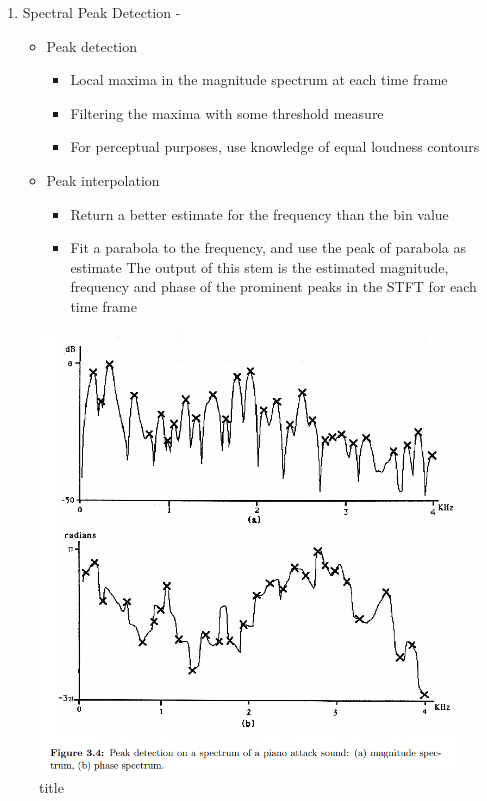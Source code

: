 \documentclass[11pt]{article}
\makeatletter
\def\maxwidth{\ifdim\Gin@nat@width>\linewidth\linewidth
    \else\Gin@nat@width\fi}
\let\Oldincludegraphics\includegraphics
\renewcommand{\includegraphics}[1]{\Oldincludegraphics[width=.8\maxwidth]{#1}}
\providecommand{\tightlist}{%
      \setlength{\itemsep}{0pt}\setlength{\parskip}{0pt}}
\makeatother
\begin{document}
    \begin{enumerate}
\def\labelenumi{\arabic{enumi}.}
\tightlist
\item
  Spectral Peak Detection -

  \begin{itemize}
  \tightlist
  \item
    Peak detection

    \begin{itemize}
    \tightlist
    \item
      Local maxima in the magnitude spectrum at each time frame
    \item
      Filtering the maxima with some threshold measure
    \item
       For perceptual purposes, use knowledge of equal loudness contours
    \end{itemize}
  \item
    Peak interpolation

    \begin{itemize}
    \tightlist
    \item
      Return a better estimate for the frequency than the bin value
    \item
      Fit a parabola to the frequency, and use the peak of parabola as
      estimate The output of this stem is the estimated magnitude,
      frequency and phase of the prominent peaks in the STFT for each
      time frame
    \end{itemize}
  \end{itemize}
\end{enumerate}

    \begin{figure}
\centering
\includegraphics{fig_3.png}
\caption{title}
\end{figure}
\end{document}
